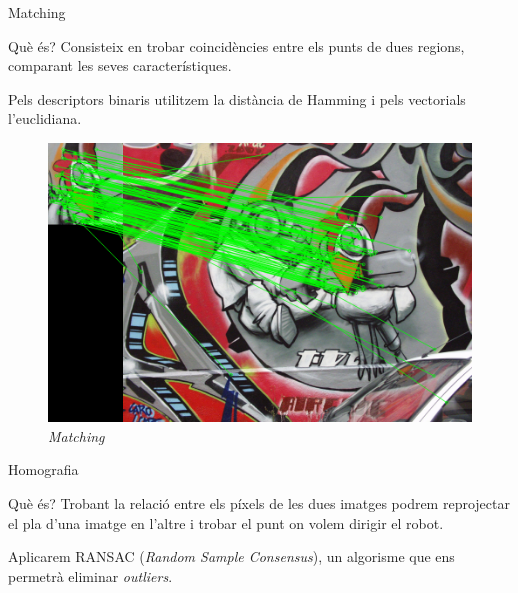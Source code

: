 \documentclass[xcolor=table, 11pt]{beamer}
\newcommand\tz{\fontsize{13}{15.6}\selectfont}
\begin{document}
	\begin{frame}{Matching}
		\tz
		\begin{minipage}{0.62\textwidth}
			\begin{block}{Què és?}
				Consisteix en trobar coincidències entre els punts de dues regions, comparant les seves característiques.\par
				Pels descriptors binaris utilitzem la distància de Hamming i pels vectorials l'euclidiana.
			\end{block}
		\end{minipage}
		\hfill
		\begin{minipage}{0.36\textwidth}
			\begin{figure}[H]
				\vspace{0.8cm}
				\includegraphics[width=\textwidth]{images/matching}
				\caption{\textit{Matching}}
			\end{figure}
		\end{minipage}
	\end{frame}

	\begin{frame}{Homografia}
		\tz
		\begin{block}{Què és?}
			Trobant la relació entre els píxels de les dues imatges podrem reprojectar el pla d'una imatge en l'altre i trobar el punt on volem dirigir el robot.
		\end{block}
		Aplicarem RANSAC (\textit{Random Sample Consensus})\cite{Fischler:1981:RSC:358669.358692},
		un algorisme que ens permetrà eliminar \textit{outliers}.
	\end{frame}
\end{document}
